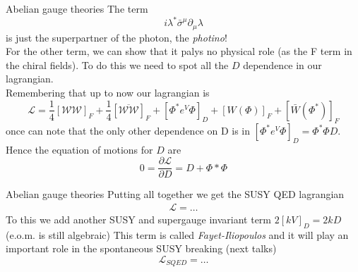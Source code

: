 \documentclass[10pt]{beamer}
\begin{document}
\begin{frame}{Abelian gauge theories}
The term 
\begin{equation*}
    i\lambda^* \bar\sigma^{\mu}\partial_{\mu} \lambda
\end{equation*}
is just the superpartner of the photon, the \emph{photino}! \\
For the other term, we can show that it palys no physical role (as the F term in the chiral fields). To do this we need to spot all the $D$ dependence in our lagrangian. \\
Remembering that up to now our lagrangian is 
\begin{equation*}
    \mathcal{L} = \frac{1}{4}\left[\mathcal{WW}\right]_F + \frac{1}{4} \left[\overline{\mathcal{WW}}\right]_F + \left[\Phi^* e^V \Phi\right]_D + [W(\Phi)]_F + [\bar W(\Phi^*)]_F
\end{equation*}
once can note that the only other dependence on D is in $\left[\Phi^* e^V \Phi \right]_D = \Phi^*\Phi D$.
Hence the equation of motions for $D$ are
\begin{equation*}
    0 = \frac{\partial \mathcal{L}}{\partial D} = D + \Phi* \Phi 
\end{equation*}
\end{frame}

\begin{frame}{Abelian gauge theories}
Putting all together we get the SUSY QED lagrangian 
\begin{gather*}
    \mathcal{L} = \dots
\end{gather*}
To this we add another SUSY and supergauge invariant term $2[kV]_D = 2kD$ (e.o.m. is still algebraic)
This term is called \emph{Fayet-Iliopoulos} and it will play an important role in the spontaneous SUSY breaking (next talks)
\begin{equation*}
    \boxed{\mathcal{L}_{SQED} = \dots}
\end{equation*}
\end{frame}
\end{document}
